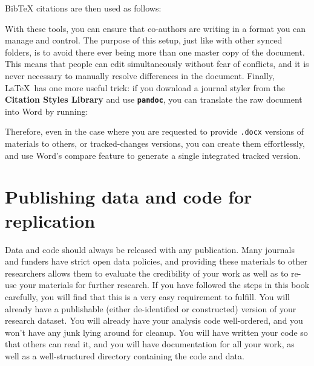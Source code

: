 {
}

\noindent BibTeX citations are then used as follows:

{
}

With these tools, you can ensure that co-authors are writing
in a format you can manage and control.\cite{flom2005latex}
The purpose of this setup, just like with other synced folders,
is to avoid there ever being more than one master copy of the document.
This means that people can edit simultaneously without fear of conflicts,
and it is never necessary to manually resolve differences in the document.
Finally, \LaTeX\ has one more useful trick:
if you download a journal styler from the \textbf{Citation Styles Library}
and use \textbf{\texttt{pandoc}},
you can translate the raw document into Word by running:

{
}

Therefore, even in the case where you are requested to provide
\texttt{.docx} versions of materials to others, or tracked-changes versions,
you can create them effortlessly,
and use Word's compare feature to generate a single integrated tracked version.


\section{Publishing data and code for replication}

Data and code should always be released with any publication.
Many journals and funders have strict open data policies,
and providing these materials to other researchers
allows them to evaluate the credibility of your work
as well as to re-use your materials for further research.
If you have followed the steps in this book carefully,
you will find that this is a very easy requirement to fulfill.
You will already have a publishable (either de-identified or constructed)
version of your research dataset.
You will already have your analysis code well-ordered,
and you won't have any junk lying around for cleanup.
You will have written your code so that others can read it,
and you will have documentation for all your work,
as well as a well-structured directory containing the code and data.

